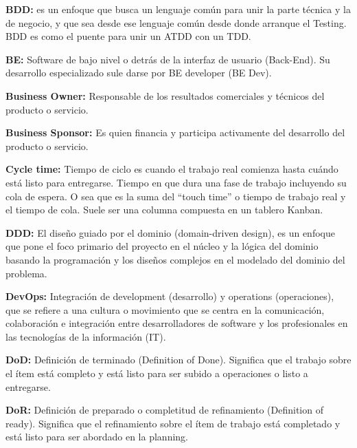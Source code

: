 \begin{description}
  \item {\textbf{BDD:} es un enfoque que busca un lenguaje común para unir la parte técnica y la de negocio, y que sea desde ese lenguaje común desde donde arranque el Testing. BDD es como el puente para unir un ATDD con un TDD.}

  \item {\textbf{BE:} Software de bajo nivel o detrás de la interfaz de usuario (Back-End). Su desarrollo especializado sule darse por BE developer (BE Dev).}

  \item {\textbf{Business Owner:} Responsable de los resultados comerciales y técnicos del producto o servicio.}
  
  \item {\textbf{Business Sponsor:} Es quien financia y participa activamente del desarrollo del producto o servicio.}
  
 \item {\textbf{Cycle time:} Tiempo de ciclo es cuando el trabajo real comienza hasta cuándo está listo para entregarse. Tiempo en que dura una fase de trabajo incluyendo su cola de espera. O sea que es la suma del “touch time” o tiempo de trabajo real y el tiempo de cola. Suele ser una columna compuesta en un tablero Kanban.}

 \item {\textbf{DDD:} El diseño guiado por el dominio (domain-driven design), es un enfoque que pone el foco primario del proyecto en el núcleo y la lógica del dominio basando la programación y los diseños complejos en el modelado del dominio del problema.
}

 \item {\textbf{DevOps:} Integración de development (desarrollo) y operations (operaciones), que se refiere a una cultura o movimiento que se centra en la comunicación, colaboración e integración entre desarrolladores de software y los profesionales en las tecnologías de la información (IT).}
 
  \item {\textbf{DoD:} Definición de terminado (Definition of Done). Significa que el trabajo sobre el ítem está completo y está listo para ser subido a operaciones o listo a entregarse.}
  
  \item {\textbf{DoR:} Definición de preparado o completitud de refinamiento (Definition of ready). Significa que el refinamiento sobre el ítem de trabajo está completado y está listo para ser abordado en la planning.}
  

\end{description}
